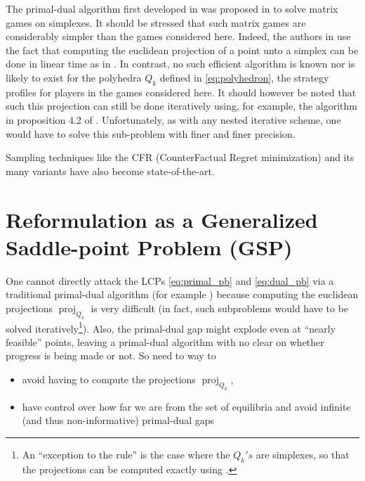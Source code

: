 \documentclass{article} %
\DeclareMathOperator{\proj}{proj}
\begin{document}


The primal-dual algorithm first developed in \cite{chambolle2010} was
proposed \cite{chambolle2014ergodic} in to solve matrix games on
simplexes. It should be stressed that such matrix games are
considerably simpler than the games considered here. Indeed, the
authors in \cite{chambolle2014ergodic} use the fact that computing the
euclidean projection of a point unto a simplex can be done in linear
time as in \cite{duchi2008efficient}. In contrast, no such efficient
algorithm is known nor is likely to exist for the polyhedra $Q_k$
defined in \eqref{eq:polyhedron}, the strategy profiles for players in
the games considered here. It should however be noted that such this
projection can still be done iteratively using, for example, the
algorithm in proposition 4.2 of \cite{combettes2010dualization}%
. Unfortunately, as
with any nested iterative scheme, one would have to solve this
sub-problem with finer and finer precision.


Sampling techniques like the CFR (CounterFactual Regret minimization)
and its many variants
\cite{MartinZinkevichNIPS2007,lanctot2009monte,Bowling09012015} have
also become state-of-the-art.


\section{Reformulation as a Generalized Saddle-point Problem (GSP)}
\label{sec:gsp}
One cannot directly attack the LCPs \eqref{eq:primal_pb} and
\eqref{eq:dual_pb} via a traditional primal-dual algorithm
(for example \cite{chambolle2010,chambolle2014ergodic}) because
computing the euclidean projections $\proj_{Q_k}$ is very difficult
(in fact, such subproblems would have to be solved
iteratively\footnote{An ``exception to the rule'' is the case where
  the $Q_k's$ are simplexes, so that the projections can be computed
  exactly using \cite{duchi2008efficient}.}). Also,
the primal-dual gap might explode even at ``nearly feasible'' points,
leaving a primal-dual algorithm with no clear on whether progress is
being made or not. So need to way to
\begin{itemize}
\item avoid having to compute the projections $\proj_{Q_k}$,
\item have control over how far we are from the set of equilibria and
  avoid infinite (and thus non-informative) primal-dual gaps
\end{itemize}
\end{document}
